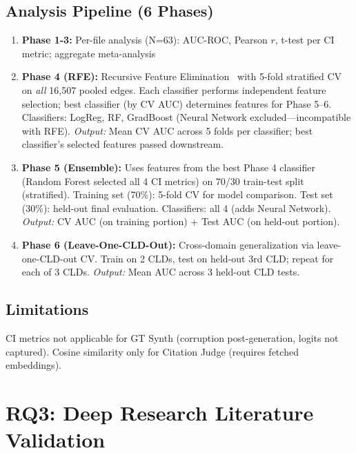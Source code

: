 \subsection{Analysis Pipeline (6 Phases)}
\begin{enumerate}[noitemsep]
    \item \textbf{Phase 1-3:} Per-file analysis (N=63): AUC-ROC, Pearson $r$, t-test per CI metric; aggregate meta-analysis
    \item \textbf{Phase 4 (RFE):} Recursive Feature Elimination~\cite{pedregosa2011sklearn} with 5-fold stratified CV on \textit{all} 16,507 pooled edges. Each classifier performs independent feature selection; best classifier (by CV AUC) determines features for Phase 5--6. Classifiers: LogReg, RF, GradBoost (Neural Network excluded---incompatible with RFE). \textit{Output:} Mean CV AUC across 5 folds per classifier; best classifier's selected features passed downstream.
    \item \textbf{Phase 5 (Ensemble):} Uses features from the best Phase 4 classifier (Random Forest selected all 4 CI metrics) on 70/30 train-test split (stratified). Training set (70\%): 5-fold CV for model comparison. Test set (30\%): held-out final evaluation. Classifiers: all 4 (adds Neural Network). \textit{Output:} CV AUC (on training portion) + Test AUC (on held-out portion).
    \item \textbf{Phase 6 (Leave-One-CLD-Out):} Cross-domain generalization via leave-one-CLD-out CV. Train on 2 CLDs, test on held-out 3rd CLD; repeat for each of 3 CLDs. \textit{Output:} Mean AUC across 3 held-out CLD tests.
\end{enumerate}

\subsection{Limitations}
CI metrics not applicable for GT Synth (corruption post-generation, logits not captured). Cosine similarity only for Citation Judge (requires fetched embeddings).

\section{RQ3: Deep Research Literature Validation}

